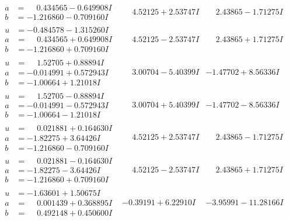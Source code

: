 \documentclass[1p]{elsarticle_modified}
\theoremstyle{definition}
\begin{document}
$$\begin{array}{c|c|c}
\begin{aligned}
a &= \phantom{-}0.434565 - 0.649908 I \\
b &= -1.216860 - 0.709160 I\end{aligned}
 & \phantom{-}4.52125 + 2.53747 I & \phantom{-}2.43865 - 1.71275 I \\ \hline\begin{aligned}
u &= -0.484578 - 1.315260 I \\
a &= \phantom{-}0.434565 + 0.649908 I \\
b &= -1.216860 + 0.709160 I\end{aligned}
 & \phantom{-}4.52125 - 2.53747 I & \phantom{-}2.43865 + 1.71275 I \\ \hline\begin{aligned}
u &= \phantom{-}1.52705 + 0.88894 I \\
a &= -0.014991 + 0.572943 I \\
b &= -1.00664 + 1.21018 I\end{aligned}
 & \phantom{-}3.00704 - 5.40399 I & -1.47702 + 8.56336 I \\ \hline\begin{aligned}
u &= \phantom{-}1.52705 - 0.88894 I \\
a &= -0.014991 - 0.572943 I \\
b &= -1.00664 - 1.21018 I\end{aligned}
 & \phantom{-}3.00704 + 5.40399 I & -1.47702 - 8.56336 I \\ \hline\begin{aligned}
u &= \phantom{-}0.021881 + 0.164630 I \\
a &= -1.82275 + 3.64426 I \\
b &= -1.216860 - 0.709160 I\end{aligned}
 & \phantom{-}4.52125 + 2.53747 I & \phantom{-}2.43865 - 1.71275 I \\ \hline\begin{aligned}
u &= \phantom{-}0.021881 - 0.164630 I \\
a &= -1.82275 - 3.64426 I \\
b &= -1.216860 + 0.709160 I\end{aligned}
 & \phantom{-}4.52125 - 2.53747 I & \phantom{-}2.43865 + 1.71275 I \\ \hline\begin{aligned}
u &= -1.63601 + 1.50675 I \\
a &= \phantom{-}0.001439 + 0.368895 I \\
b &= \phantom{-}0.492148 + 0.450600 I\end{aligned}
 & -0.39191 + 6.22910 I & -3.95991 - 11.28166 I \\ \hline\begin{aligned}

\end{aligned}
\end{array}$$
\end{document}
